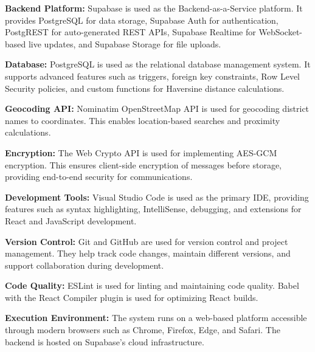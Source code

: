 \documentclass[12pt,a4paper]{report}
\begin{document}
\vspace{0.4cm}

\textbf{Backend Platform:}
Supabase is used as the Backend-as-a-Service platform. It provides PostgreSQL for data storage, Supabase Auth for authentication, PostgREST for auto-generated REST APIs, Supabase Realtime for WebSocket-based live updates, and Supabase Storage for file uploads.

\vspace{0.4cm}

\textbf{Database:}
PostgreSQL is used as the relational database management system. It supports advanced features such as triggers, foreign key constraints, Row Level Security policies, and custom functions for Haversine distance calculations.

\vspace{0.4cm}

\textbf{Geocoding API:}
Nominatim OpenStreetMap API is used for geocoding district names to coordinates. This enables location-based searches and proximity calculations.

\vspace{0.4cm}

\textbf{Encryption:}
The Web Crypto API is used for implementing AES-GCM encryption. This ensures client-side encryption of messages before storage, providing end-to-end security for communications.

\vspace{0.4cm}

\textbf{Development Tools:}
Visual Studio Code is used as the primary IDE, providing features such as syntax highlighting, IntelliSense, debugging, and extensions for React and JavaScript development.

\vspace{0.4cm}

\textbf{Version Control:}
Git and GitHub are used for version control and project management. They help track code changes, maintain different versions, and support collaboration during development.

\vspace{0.4cm}

\textbf{Code Quality:}
ESLint is used for linting and maintaining code quality. Babel with the React Compiler plugin is used for optimizing React builds.

\vspace{0.4cm}

\textbf{Execution Environment:}
The system runs on a web-based platform accessible through modern browsers such as Chrome, Firefox, Edge, and Safari. The backend is hosted on Supabase's cloud infrastructure.
\end{document}
